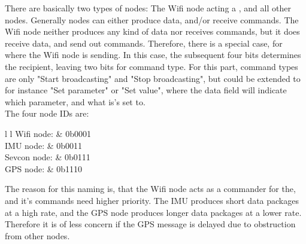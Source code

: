 There are basically two types of nodes: The Wifi node acting a , and all other nodes.
Generally nodes can either produce data, and/or receive commands.
The Wifi node neither produces any kind of data nor receives commands, but it does receive data, and send out commands.
Therefore, there is a special case, for where the Wifi node is sending.
In this case, the subsequent four bits determines the recipient, leaving two bits for command type. 
For this part, command types are only "Start broadcasting" and "Stop broadcasting", but could be extended to for instance "Set parameter" or "Set value", where the data field will indicate which parameter, and what is's set to.\\

The four node IDs are:
\begin{table}[h!]
	\begin{tabular}{{l} {l}}
		Wifi node: & 0b0001 \\
		IMU node: & 0b0011 \\
		Sevcon node: & 0b0111 \\
		GPS node: & 0b1110
	\end{tabular}
\end{table}
The reason for this naming is, that the Wifi node acts as a commander for the, and it's commands need higher priority.
The IMU produces short data packages at a high rate, and the GPS node produces longer data packages at a lower rate. 
Therefore it is of less concern if the GPS message is delayed due to obstruction from other nodes. 